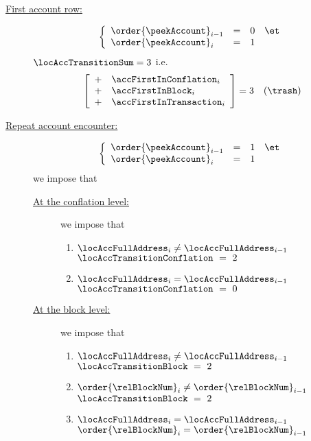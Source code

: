 \begin{description}
	\item[\underline{\underline{First account row:}}] 
		\If
		\[
			\left\{ \begin{array}{lclc}
				\order{\peekAccount} _{i - 1} & = & 0  & \et \\
				\order{\peekAccount} _{i}     & = & 1 \\
			\end{array} \right.
		\]
		\Then $\locAccTransitionSum = 3$ i.e.
		\[
			\left[ \begin{array}{cl}
				+ & \accFirstInConflation  _{i} \\
				+ & \accFirstInBlock       _{i} \\
				+ & \accFirstInTransaction _{i} \\
			\end{array} \right]
			= 3 \quad (\trash)
		\]
	\item[\underline{\underline{Repeat account encounter:}}] 
		\If
		\[
			\left\{ \begin{array}{lclc}
				\order{\peekAccount} _{i - 1} & = & 1 & \et \\
				\order{\peekAccount} _{i}     & = & 1 \\
			\end{array} \right.
		\]
		\Then we impose that
		\begin{description}
			\item[\underline{At the conflation  level:}] we impose that
				\begin{enumerate}
					\item \label{hub: consistency: account: first and final: conflation} \If $\locAccFullAddress _{i} \neq \locAccFullAddress_{i - 1}$ \Then
						$ \locAccTransitionConflation ~=~ 2 $
					\item \If $\locAccFullAddress _{i} =    \locAccFullAddress_{i - 1}$ \Then
						$ \locAccTransitionConflation ~=~ 0 $
				\end{enumerate}
			\item[\underline{At the block       level:}] we impose that
				\begin{enumerate}[resume]
					\item \label{hub: consistency: account: first and final: block} \If $\locAccFullAddress _{i} \neq \locAccFullAddress_{i - 1}$ \Then
						$ \locAccTransitionBlock ~=~ 2 $
					\item \If $\order{\relBlockNum}_{i} \neq \order{\relBlockNum}_{i - 1}$ \Then
						$ \locAccTransitionBlock ~=~ 2 $
					\item \If $\locAccFullAddress _{i} =    \locAccFullAddress_{i - 1}$ \et $\order{\relBlockNum}_{i} =    \order{\relBlockNum}_{i - 1}$ \Then

\end{enumerate}
\end{description}
\end{description}

